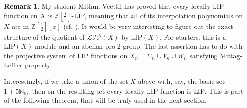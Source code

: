 \documentclass[10pt]{article}
\theoremstyle{definition}
\newtheorem{remark}{Remark}
\begin{document}
\begin{remark} My student Mithun Veettil has proved that every locally LIP function on $X$ is $\mathbb Z[\frac{1}{2}]$-LIP, meaning that all of its interpolation polynomials on $X$ are in $\mathbb Z[\frac{1}{2}] [x]$ (cf. \cite{MithunThesis}).  It would be very interesting to figure out the exact structure of the quotient of $\mathcal{LIP}(X)$ by $\textrm{LIP} (X)$. For starters, this is a $\textrm{LIP} (X)$-module and an abelian pro-2-group. The last assertion has to do with the projective system of LIP functions on $X_n=U_n\cup V_n \cup W_n$ satisfying Mittag-Leffler property.
\end{remark}

Interestingly, if we take a union of the set $X$ above with, say, the basic set $1+5\mathbb N_0,$ then on the resulting set every locally LIP function  is LIP. This is part of the following theorem, that will be truly used in the next section.
\end{document}
